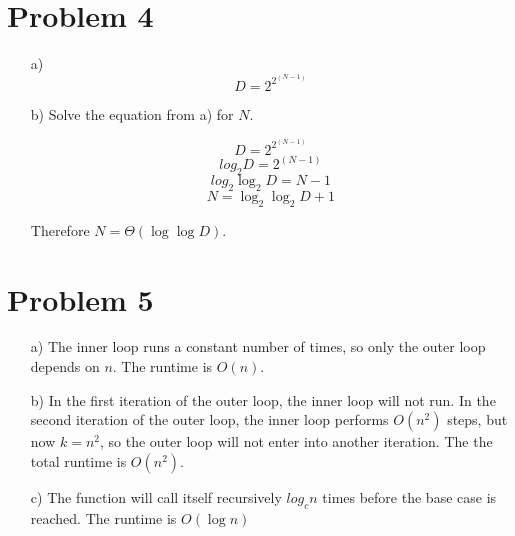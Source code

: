 \documentclass{article}
\begin{document}
\section*{Problem 4}

\begin{itemize}
\item[a)] 
$$D = 2^{2^{(N-1)}}$$

\item[b)] Solve the equation from a) for $N$.

$$D = 2^{2^{(N-1)}}$$
$$log_2 D = 2^{(N-1)} $$
$$log_2 \log_2 D = N-1$$
$$N = \log_2 \log_2 D  + 1$$
 
Therefore $N = \Theta{(\log \log D)}$.
\end{itemize}

\section*{Problem 5}

\begin{itemize}
  \item[a)] The inner loop runs a constant number of times, so only the outer loop depends on $n$. The runtime is $O(n)$.
  \item[b)] In the first iteration of the outer loop, the inner loop will not run. In the second iteration of the outer loop, the inner loop performs $O(n^2)$ steps, but now $k = n^2$, so the outer loop will not enter into another iteration. The the total runtime is $O(n^2)$. 
  \item[c)] The function will call itself recursively $log_c n$ times before the base case is reached. The runtime is $O(\log n)$
\end{itemize}
\end{document}
